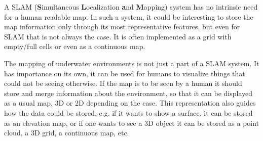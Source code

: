 A SLAM (\textbf{S}imultaneous \textbf{L}ocalization \textbf{a}nd
\textbf{M}apping) system has no intrinsic need for a human readable map.
In such a system, it could be interesting to store the map information only
through its most representative features, but even for SLAM that is not always
the case. It is often implemented as a grid with empty/full cells or even as a
continuous map.

The mapping of underwater environments is not just a part of a SLAM system. It
has importance on its own, it can be used for humans to visualize things that
could not be seeing otherwise. If the map is to be seen by a human it should
store and merge information about the environment, so that it can be displayed
as a usual map, 3D or 2D depending on the case. This representation also guides
how the data could be stored, e.g. if it wants to show a surface, it can be
stored as an elevation map, or if one wants to see a 3D object it can be stored
as a point cloud, a 3D grid, a continuous map, etc.


%



